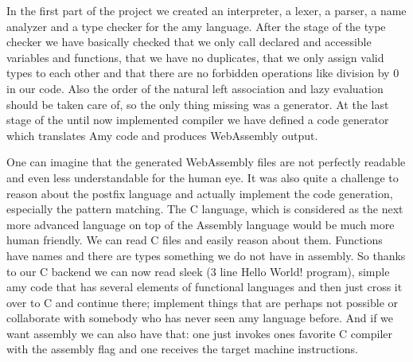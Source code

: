 %

In the first part of the project we created an interpreter, a lexer, a parser, a name analyzer and a type checker for the amy language.
After the stage of the type checker we have basically checked that we only call declared and accessible variables and functions, that we have no duplicates, that we only assign valid types to each other and that there are no forbidden operations like division by 0 in our code. Also the order of the natural left association and lazy evaluation should be taken care of, so the only thing missing was a generator.
At the last stage of the until now implemented compiler we have defined a code generator which translates Amy code and produces WebAssembly output.

One can imagine that the generated WebAssembly files are not perfectly readable and even less understandable for the human eye. It was also quite a challenge to reason about the postfix language and actually implement the code generation, especially the pattern matching.
The C language, which is considered as the next more advanced language on top of the Assembly language would be much more human friendly. We can read C files and easily reason about them. Functions have names and there are types something we do not have in assembly. So thanks to our C backend we can now read sleek (3 line Hello World! program), simple amy code that has several elements of functional languages and then just cross it over to C and continue there; implement things that are perhaps not possible or collaborate with somebody who has never seen amy language before. And if we want assembly we can also have that: one just invokes ones favorite C compiler with the assembly flag and one receives the target machine instructions.
